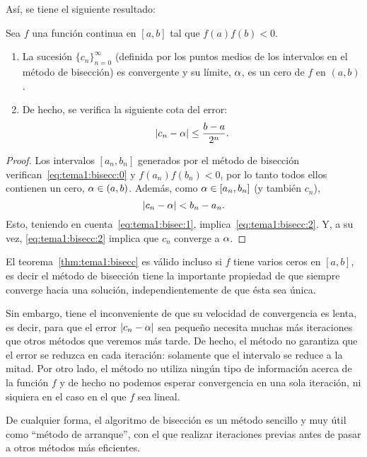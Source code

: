 Así, se tiene el siguiente resultado:
\begin{theorem}
  \label{thm:tema1:bisecc}
  Sea $f$ una función continua en $[a,b]$ tal que $f(a)f(b)<0$.
  \begin{enumerate}
  \item La sucesión $\{c_n\}_{n=0}^\infty$ (definida por los puntos
    medios de los intervalos en el método de bisección) es convergente
    y su límite, $\alpha$, es un cero de $f$ en $(a,b)$.
  \item De hecho, se verifica la siguiente cota del error:
    \begin{equation}
      \label{eq:tema1:bisecc:2}
      |c_n-\alpha| \le \frac{b-a}{2^n}.
    \end{equation}
  \end{enumerate}
\end{theorem}

\begin{proof}
  Los intervalos $[a_n,b_n]$ generados por el método de bisección
  verifican~\eqref{eq:tema1:bisecc:0} y $f(a_n)f(b_n)<0$, por lo tanto
  todos ellos contienen un cero, $\alpha\in (a,b)$. Además, como
  $\alpha\in [a_n,b_n]$ (y también $c_n$),
  $$
  |c_n - \alpha| < b_n - a_n.
  $$
  Esto, teniendo en cuenta~\eqref{eq:tema1:bisec:1},
  implica~\eqref{eq:tema1:bisecc:2}. Y, a su vez,
  \eqref{eq:tema1:bisecc:2} implica que $c_n$ converge a $\alpha$.
\end{proof}

El teorema~\ref{thm:tema1:bisecc} es válido incluso si $f$ tiene
varios ceros en $[a,b]$, es decir el método de bisección tiene la
importante propiedad de que siempre converge hacia una solución,
independientemente de que ésta sea única.
  
Sin embargo, tiene el inconveniente de que su velocidad de
convergencia es lenta, es decir, para que el error $|c_n-\alpha|$ sea
pequeño necesita muchas más iteraciones que otros métodos que veremos
más tarde. De hecho, el método no garantiza que el error se reduzca en
cada iteración: solamente que el intervalo se reduce a la mitad. Por
otro lado, el método no utiliza ningún tipo de información acerca de
la función $f$ y de hecho no podemos esperar convergencia en una sola
iteración, ni siquiera en el caso en el que $f$ sea lineal.

De cualquier forma, el algoritmo de bisección es un método sencillo y
muy útil como ``método de arranque'', con el que realizar iteraciones
previas antes de pasar a otros métodos más eficientes.

